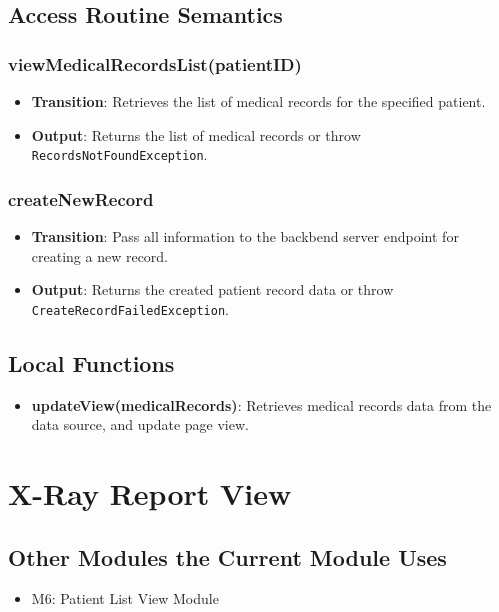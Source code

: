 \documentclass[12pt, titlepage]{article}
\begin{document}
\subsection{Access Routine Semantics}
\subsubsection{viewMedicalRecordsList(patientID)}
\begin{itemize}
    \item \textbf{Transition}: Retrieves the list of medical records for the specified patient.
    \item \textbf{Output}: Returns the list of medical records or throw \texttt{RecordsNotFoundException}.
\end{itemize}
\subsubsection{createNewRecord}
\begin{itemize}
    \item \textbf{Transition}: Pass all information to the backbend server endpoint for creating a new record.
    \item \textbf{Output}: Returns the created patient record data or throw \texttt{CreateRecordFailedException}.
\end{itemize}

\newpage
\subsection{Local Functions}
\begin{itemize}
\item \textbf{updateView(medicalRecords)}: Retrieves medical records data from the data source, and update page view.
\end{itemize}

\section{X-Ray Report View}

\subsection{Other Modules the Current Module Uses}
\begin{itemize}
  \item M6: Patient List View Module
\end{itemize}
\end{document}
